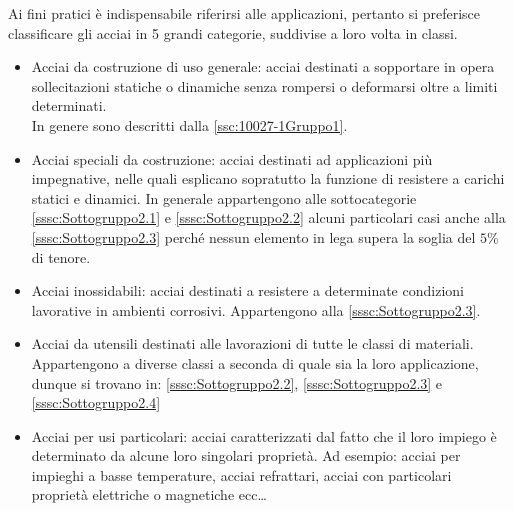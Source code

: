 Ai fini pratici è indispensabile riferirsi alle applicazioni, pertanto si preferisce classificare gli acciai in 5 grandi categorie, suddivise a loro volta in classi.
\begin{itemize}
\item Acciai da costruzione di uso generale: acciai destinati a sopportare in opera sollecitazioni statiche o dinamiche senza rompersi o deformarsi oltre a limiti determinati.\\
In genere sono descritti dalla \ref{ssc:10027-1Gruppo1}.
\item Acciai speciali da costruzione: acciai destinati ad applicazioni più impegnative, nelle quali esplicano sopratutto la funzione di resistere a carichi statici e dinamici. In generale appartengono alle sottocategorie \ref{sssc:Sottogruppo2.1} e \ref{sssc:Sottogruppo2.2} alcuni particolari casi anche alla \ref{sssc:Sottogruppo2.3} perché nessun elemento in lega supera la soglia del $5\%$ di tenore.
\item Acciai inossidabili: acciai destinati a resistere a determinate condizioni lavorative in ambienti corrosivi. Appartengono alla \ref{sssc:Sottogruppo2.3}.
\item Acciai da utensili destinati alle lavorazioni di tutte le classi di materiali. Appartengono a diverse classi a seconda di quale sia la loro applicazione, dunque si trovano in: \ref{sssc:Sottogruppo2.2}, \ref{sssc:Sottogruppo2.3} e \ref{sssc:Sottogruppo2.4}
\item Acciai per usi particolari: acciai caratterizzati dal fatto che il loro impiego è determinato da alcune loro singolari proprietà. Ad esempio: acciai per impieghi a basse temperature, acciai refrattari, acciai con particolari proprietà elettriche o magnetiche ecc\dots
\end{itemize}
